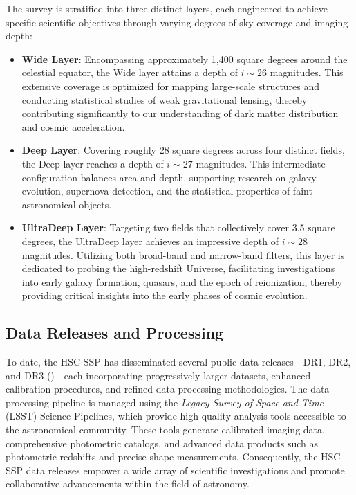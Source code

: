 The survey is stratified into three distinct layers, each engineered to achieve specific scientific objectives through varying degrees of sky coverage and imaging depth:

\begin{itemize}
    \item \textbf{Wide Layer}: Encompassing approximately 1,400 square degrees around the celestial equator, the Wide layer attains a depth of $i \sim 26$ magnitudes. This extensive coverage is optimized for mapping large-scale structures and conducting statistical studies of weak gravitational lensing, thereby contributing significantly to our understanding of dark matter distribution and cosmic acceleration.

    \item \textbf{Deep Layer}: Covering roughly 28 square degrees across four distinct fields, the Deep layer reaches a depth of $i \sim 27$ magnitudes. This intermediate configuration balances area and depth, supporting research on galaxy evolution, supernova detection, and the statistical properties of faint astronomical objects.

    \item \textbf{UltraDeep Layer}: Targeting two fields that collectively cover 3.5 square degrees, the UltraDeep layer achieves an impressive depth of $i \sim 28$ magnitudes. Utilizing both broad-band and narrow-band filters, this layer is dedicated to probing the high-redshift Universe, facilitating investigations into early galaxy formation, quasars, and the epoch of reionization, thereby providing critical insights into the early phases of cosmic evolution.
\end{itemize}

\subsection{Data Releases and Processing}

To date, the HSC-SSP has disseminated several public data releases—DR1, DR2, and DR3 (\citealt{2018PASJ...70S...8A, 2019PASJ...71..114A, 2022PASJ...74..247A})—each incorporating progressively larger datasets, enhanced calibration procedures, and refined data processing methodologies. The data processing pipeline is managed using the \emph{Legacy Survey of Space and Time} (LSST) Science Pipelines, which provide high-quality analysis tools accessible to the astronomical community. These tools generate calibrated imaging data, comprehensive photometric catalogs, and advanced data products such as photometric redshifts and precise shape measurements. Consequently, the HSC-SSP data releases empower a wide array of scientific investigations and promote collaborative advancements within the field of astronomy.
